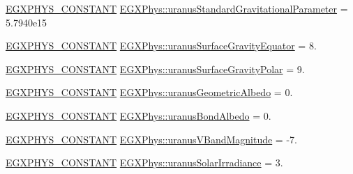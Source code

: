 \begin{DoxyCompactItemize}
\item 
\mbox{\hyperlink{group___e_g_x_phys-_constants-_macros_ga76980d288494ce1714c9ac68a95ba702}{E\+G\+X\+P\+H\+Y\+S\+\_\+\+C\+O\+N\+S\+T\+A\+NT}} \mbox{\hyperlink{group___e_g_x_phys-_constants-_astrophysics-_solar_system-_uranus-_bulk_ga2638d351b4c8647d718febed6c4d6aa3}{E\+G\+X\+Phys\+::uranus\+Standard\+Gravitational\+Parameter}} = 5.\+7940e15
\item 
\mbox{\hyperlink{group___e_g_x_phys-_constants-_macros_ga76980d288494ce1714c9ac68a95ba702}{E\+G\+X\+P\+H\+Y\+S\+\_\+\+C\+O\+N\+S\+T\+A\+NT}} \mbox{\hyperlink{group___e_g_x_phys-_constants-_astrophysics-_solar_system-_uranus-_bulk_gaf69b423e76cf2feda0f1ea87eedc698b}{E\+G\+X\+Phys\+::uranus\+Surface\+Gravity\+Equator}} = 8.
\item 
\mbox{\hyperlink{group___e_g_x_phys-_constants-_macros_ga76980d288494ce1714c9ac68a95ba702}{E\+G\+X\+P\+H\+Y\+S\+\_\+\+C\+O\+N\+S\+T\+A\+NT}} \mbox{\hyperlink{group___e_g_x_phys-_constants-_astrophysics-_solar_system-_uranus-_bulk_gaac7f0c911f8e118ff773010111851360}{E\+G\+X\+Phys\+::uranus\+Surface\+Gravity\+Polar}} = 9.
\item 
\mbox{\hyperlink{group___e_g_x_phys-_constants-_macros_ga76980d288494ce1714c9ac68a95ba702}{E\+G\+X\+P\+H\+Y\+S\+\_\+\+C\+O\+N\+S\+T\+A\+NT}} \mbox{\hyperlink{group___e_g_x_phys-_constants-_astrophysics-_solar_system-_uranus-_bulk_ga9a1cfdab26c38a850508aa9b1e2409a1}{E\+G\+X\+Phys\+::uranus\+Geometric\+Albedo}} = 0.
\item 
\mbox{\hyperlink{group___e_g_x_phys-_constants-_macros_ga76980d288494ce1714c9ac68a95ba702}{E\+G\+X\+P\+H\+Y\+S\+\_\+\+C\+O\+N\+S\+T\+A\+NT}} \mbox{\hyperlink{group___e_g_x_phys-_constants-_astrophysics-_solar_system-_uranus-_bulk_ga0efbea809d5a024652044e18ac4bf0c5}{E\+G\+X\+Phys\+::uranus\+Bond\+Albedo}} = 0.
\item 
\mbox{\hyperlink{group___e_g_x_phys-_constants-_macros_ga76980d288494ce1714c9ac68a95ba702}{E\+G\+X\+P\+H\+Y\+S\+\_\+\+C\+O\+N\+S\+T\+A\+NT}} \mbox{\hyperlink{group___e_g_x_phys-_constants-_astrophysics-_solar_system-_uranus-_bulk_ga781508a60603feae345f1941de8204fa}{E\+G\+X\+Phys\+::uranus\+V\+Band\+Magnitude}} = -\/7.
\item 
\mbox{\hyperlink{group___e_g_x_phys-_constants-_macros_ga76980d288494ce1714c9ac68a95ba702}{E\+G\+X\+P\+H\+Y\+S\+\_\+\+C\+O\+N\+S\+T\+A\+NT}} \mbox{\hyperlink{group___e_g_x_phys-_constants-_astrophysics-_solar_system-_uranus-_bulk_gab404609141c0f15c982dd80012e9dbcd}{E\+G\+X\+Phys\+::uranus\+Solar\+Irradiance}} = 3.

\end{DoxyCompactItemize}
